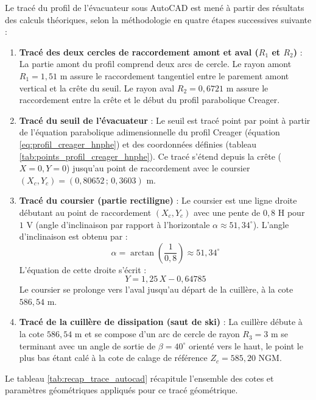 Le tracé du profil de l'évacuateur sous AutoCAD est mené à partir des résultats des calculs théoriques, selon la méthodologie en quatre étapes successives suivante :
\begin{enumerate}
    \item \textbf{Tracé des deux cercles de raccordement amont et aval ($R_1$ et $R_2$)} : La partie amont du profil comprend deux arcs de cercle. Le rayon amont $R_1 = 1{,}51$ m assure le raccordement tangentiel entre le parement amont vertical et la crête du seuil. Le rayon aval $R_2 = 0{,}6721$ m assure le raccordement entre la crête et le début du profil parabolique Creager.
    \item \textbf{Tracé du seuil de l'évacuateur} : Le seuil est tracé point par point à partir de l'équation parabolique adimensionnelle du profil Creager (équation \ref{eq:profil_creager_hnphe}) et des coordonnées définies (tableau \ref{tab:points_profil_creager_hnphe}). Ce tracé s'étend depuis la crête ($X=0, Y=0$) jusqu'au point de raccordement avec le coursier $(X_c,Y_c) = (0{,}80652\,;\,0{,}3603)$ m.
    \item \textbf{Tracé du coursier (partie rectiligne)} : Le coursier est une ligne droite débutant au point de raccordement $(X_c,Y_c)$ avec une pente de $0{,}8$ H pour $1$ V (angle d'inclinaison par rapport à l'horizontale $\alpha \approx 51{,}34^\circ$).
    L'angle d'inclinaison est obtenu par :
    \begin{equation}
    \alpha = \arctan\left(\frac{1}{0{,}8}\right) \approx 51{,}34^\circ
    \label{eq:angle_coursier}
    \end{equation}
    L'équation de cette droite s'écrit :
    \begin{equation}
    Y = 1{,}25\,X - 0{,}64785
    \label{eq:droite_coursier}
    \end{equation}
    Le coursier se prolonge vers l'aval jusqu'au départ de la cuillère, à la cote $586{,}54$ m.
    \item \textbf{Tracé de la cuillère de dissipation (saut de ski)} : La cuillère débute à la cote $586{,}54$ m et se compose d'un arc de cercle de rayon $R_3 = 3$ m se terminant avec un angle de sortie de $\beta = 40^\circ$ orienté vers le haut, le point le plus bas étant calé à la cote de calage de référence $Z_c = 585{,}20$ NGM.
\end{enumerate}

Le tableau \ref{tab:recap_trace_autocad} récapitule l'ensemble des cotes et paramètres géométriques appliqués pour ce tracé géométrique.

